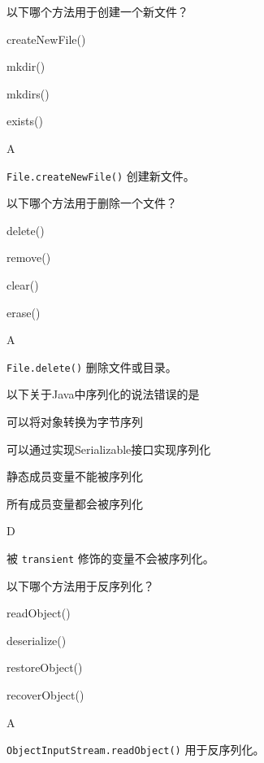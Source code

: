 \begin{question}
	以下哪个方法用于创建一个新文件？
	\begin{options}
		\item createNewFile()
		\item mkdir()
		\item mkdirs()
		\item exists()
	\end{options}
	\begin{answer}
		A
	\end{answer}
	\begin{explanation}
		\texttt{File.createNewFile()} 创建新文件。
	\end{explanation}
\end{question}

\begin{question}
	以下哪个方法用于删除一个文件？
	\begin{options}
		\item delete()
		\item remove()
		\item clear()
		\item erase()
	\end{options}
	\begin{answer}
		A
	\end{answer}
	\begin{explanation}
		\texttt{File.delete()} 删除文件或目录。
	\end{explanation}
\end{question}

\begin{question}
	以下关于Java中序列化的说法错误的是
	\begin{options}
		\item 可以将对象转换为字节序列
		\item 可以通过实现Serializable接口实现序列化
		\item 静态成员变量不能被序列化
		\item 所有成员变量都会被序列化
	\end{options}
	\begin{answer}
		D
	\end{answer}
	\begin{explanation}
		被 \texttt{transient} 修饰的变量不会被序列化。
	\end{explanation}
\end{question}

\begin{question}
	以下哪个方法用于反序列化？
	\begin{options}
		\item readObject()
		\item deserialize()
		\item restoreObject()
		\item recoverObject()
	\end{options}
	\begin{answer}
		A
	\end{answer}
	\begin{explanation}
		\texttt{ObjectInputStream.readObject()} 用于反序列化。
	\end{explanation}
\end{question}
